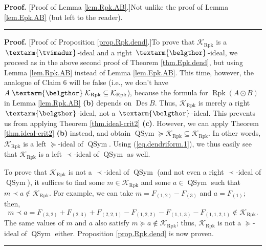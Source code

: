 \documentclass[numbers=enddot,12pt,final,onecolumn,notitlepage]{scrartcl}%
\theoremstyle{definition}
\newenvironment{proof}[1][Proof]{\noindent\textbf{#1.} }{\ \rule{0.5em}{0.5em}}
\newcommand{\tvi}{\left. \textarm{\tvimadur} \right.}
\newcommand{\bel}{\left. \textarm{\belgthor} \right.}
\begin{document}
\begin{proof}
[Proof of Lemma \ref{lem.Rpk.AB}.]Not unlike the proof of Lemma
\ref{lem.Epk.AB} (but left to the reader).
\end{proof}

\begin{proof}
[Proof of Proposition \ref{prop.Rpk.dend}.]To prove that $\mathcal{K}%
_{\operatorname*{Rpk}}$ is a $\tvi$-ideal and a right $\bel$-ideal, we proceed
as in the above second proof of Theorem \ref{thm.Epk.dend}, but using Lemma
\ref{lem.Rpk.AB} instead of Lemma \ref{lem.Epk.AB}. This time, however, the
analogue of Claim 6 will be false (i.e., we don't have $A\bel\mathcal{K}%
_{\operatorname*{Rpk}}\subseteq\mathcal{K}_{\operatorname*{Rpk}}$), because
the formula for $\operatorname*{Rpk}\left(  A\odot B\right)  $ in Lemma
\ref{lem.Rpk.AB} \textbf{(b)} depends on $\operatorname*{Des}B$. Thus,
$\mathcal{K}_{\operatorname*{Rpk}}$ is merely a right $\bel$-ideal, not a
$\bel$-ideal. This prevents us from applying Theorem \ref{thm.ideal-crit2}
\textbf{(c)}. However, we can apply Theorem \ref{thm.ideal-crit2} \textbf{(b)}
instead, and obtain $\operatorname*{QSym}\left.  \succeq\right.
\mathcal{K}_{\operatorname*{Rpk}}\subseteq\mathcal{K}_{\operatorname*{Rpk}}$.
In other words, $\mathcal{K}_{\operatorname*{Rpk}}$ is a left $\left.
\succeq\right.  $-ideal of $\operatorname*{QSym}$. Using
(\ref{eq.dendriform.1}), we thus easily see that $\mathcal{K}%
_{\operatorname*{Rpk}}$ is a left $\left.  \prec\right.  $-ideal of
$\operatorname*{QSym}$ as well.

To prove that $\mathcal{K}_{\operatorname*{Rpk}}$ is not a $\left.
\prec\right.  $-ideal of $\operatorname*{QSym}$ (and not even a right $\left.
\prec\right.  $-ideal of $\operatorname*{QSym}$), it suffices to find some
$m\in\mathcal{K}_{\operatorname*{Rpk}}$ and some $a\in\operatorname*{QSym}$
such that $m\left.  \prec\right.  a\notin\mathcal{K}_{\operatorname*{Rpk}}$.
For example, we can take $m=F_{\left(  1,2\right)  }-F_{\left(  3\right)  }$
and $a=F_{\left(  1\right)  }$; then,
\[
m\left.  \prec\right.  a=F_{\left(  3,2\right)  }+F_{\left(  2,3\right)
}+F_{\left(  2,2,1\right)  }-F_{\left(  1,2,2\right)  }-F_{\left(
1,1,3\right)  }-F_{\left(  1,1,2,1\right)  }\notin\mathcal{K}%
_{\operatorname*{Rpk}}.
\]
The same values of $m$ and $a$ also satisfy $m\left.  \succeq\right.
a\notin\mathcal{K}_{\operatorname*{Rpk}}$; thus, $\mathcal{K}%
_{\operatorname*{Rpk}}$ is not a $\left.  \succeq\right.  $-ideal of
$\operatorname*{QSym}$ either. Proposition \ref{prop.Rpk.dend} is now proven.
\end{proof}
\end{document}
